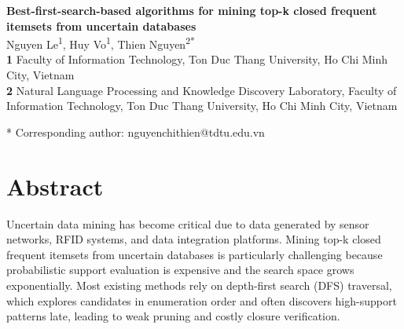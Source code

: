 \documentclass[10pt,letterpaper]{article}
\begin{document}
\vspace*{0.2in}

\begin{flushleft}
{\Large
\textbf{Best-first-search-based algorithms for mining top-k closed frequent itemsets from uncertain databases} %
}
\newline
\\
Nguyen Le\textsuperscript{1},
Huy Vo\textsuperscript{1},
Thien Nguyen\textsuperscript{2*}
\\
\bigskip
\textbf{1} Faculty of Information Technology, Ton Duc Thang University, Ho Chi Minh City, Vietnam
\\
\textbf{2} Natural Language Processing and Knowledge Discovery Laboratory, Faculty of Information Technology, Ton Duc Thang University, Ho Chi Minh City, Vietnam
\\
\bigskip

* Corresponding author: nguyenchithien@tdtu.edu.vn

\end{flushleft}


%
\section*{Abstract}
Uncertain data mining has become critical due to data generated by sensor
networks, RFID systems, and data integration platforms. Mining top-k closed frequent itemsets from uncertain databases is particularly challenging because probabilistic support evaluation is expensive and the search space grows exponentially. Most existing methods rely on depth-first search (DFS) traversal, which explores candidates in enumeration order and often discovers high-support patterns late, leading to weak pruning and costly closure
verification.
\end{document}
